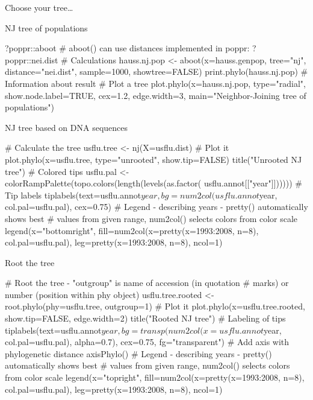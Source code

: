 \documentclass[compress, ucs, xelatex, 11pt, xcolor=svgnames, aspectratio=169,
	hyperref={
		bookmarks=true,
		unicode=true,
		colorlinks=true,
		pdftitle={Molecular data in R},
		plainpages=false,
		pdfauthor={Vojtech Zeisek},
		pdfsubject={Course about phylogeny and evolution in R},
		pdfcreator={XeLaTeX},
		pdfkeywords={R, evolution, phylogeny, molecular data},
		linkcolor=Crimson, %
		anchorcolor=Magenta, %
		citecolor=Magenta, %
		filecolor=Magenta, %
		menucolor=Magenta, %
		urlcolor=DodgerBlue, %
		pdftex},
	url={hyphens, lowtilde} %
	]{beamer}
\renewcommand{\texttt}[1]{\colorbox{Beige}{{\ttfamily #1}}}
\begin{document}
\begin{frame}{Choose your tree\ldots}
	\begin{center}
		\texttt{[image: nj-upgma-bruvo.png]}
	\end{center}
\end{frame}

\begin{frame}[fragile]{NJ tree of populations}
	\begin{spluscode}
    ?poppr::aboot # aboot() can use distances implemented in poppr:
    ?poppr::nei.dist
    # Calculations
    hauss.nj.pop <- aboot(x=hauss.genpop, tree="nj", distance="nei.dist",
      sample=1000, showtree=FALSE)
    print.phylo(hauss.nj.pop) # Information about result
    # Plot a tree
    plot.phylo(x=hauss.nj.pop, type="radial", show.node.label=TRUE,
      cex=1.2, edge.width=3, main="Neighbor-Joining tree of populations")
	\end{spluscode}
	\begin{center}
		\texttt{[image: nj\_pop.png]}
	\end{center}
\end{frame}

\begin{frame}[fragile]{NJ tree based on DNA sequences}
	\begin{spluscode}
    # Calculate the tree
    usflu.tree <- nj(X=usflu.dist)
    # Plot it
    plot.phylo(x=usflu.tree, type="unrooted", show.tip=FALSE)
    title("Unrooted NJ tree")
    # Colored tips
    usflu.pal <- colorRampPalette(topo.colors(length(levels(as.factor(
      usflu.annot[["year"]])))))
    # Tip labels
    tiplabels(text=usflu.annot$year, bg=num2col(usflu.annot$year,
      col.pal=usflu.pal), cex=0.75)
    # Legend - describing years - pretty() automatically shows best
    # values from given range, num2col() selects colors from color scale
    legend(x="bottomright", fill=num2col(x=pretty(x=1993:2008, n=8),
      col.pal=usflu.pal), leg=pretty(x=1993:2008, n=8), ncol=1)
	\end{spluscode}
\end{frame}

\begin{frame}[fragile]{Root the tree}
	\begin{spluscode}
    # Root the tree - "outgroup" is name of accession (in quotation
    # marks) or number (position within phy object)
    usflu.tree.rooted <- root.phylo(phy=usflu.tree, outgroup=1)
    # Plot it
    plot.phylo(x=usflu.tree.rooted, show.tip=FALSE, edge.width=2)
    title("Rooted NJ tree")
    # Labeling of tips
    tiplabels(text=usflu.annot$year, bg=transp(num2col(x=usflu.annot$year,
      col.pal=usflu.pal), alpha=0.7), cex=0.75, fg="transparent")
    # Add axis with phylogenetic distance
    axisPhylo()
    # Legend - describing years - pretty() automatically shows best
    # values from given range, num2col() selects colors from color scale
    legend(x="topright", fill=num2col(x=pretty(x=1993:2008, n=8),
      col.pal=usflu.pal), leg=pretty(x=1993:2008, n=8), ncol=1)
	\end{spluscode}
\end{frame}
\end{document}
